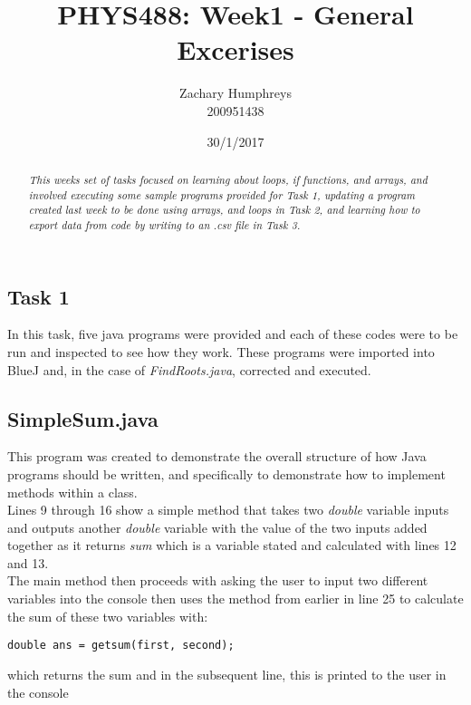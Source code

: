 \documentclass{article}
\title{PHYS488: Week1 - General Excerises}
\author{Zachary Humphreys \\ 200951438}
\date{30/1/2017}
\begin{document}
	\maketitle
	\begin{abstract}
		\begin{center}
		\textit{This weeks set of tasks focused on learning about loops, if functions, and arrays, and involved executing some sample programs provided for Task 1, updating a program created last week to be done using arrays, and loops in Task 2, and learning how to export data from code by writing to an .csv file in Task 3.}
		\end{center}
	\end{abstract}
\begin{multicols}{2}
	\section{Task 1}
		In this task, five java programs were provided and each of these codes were to be run and inspected to see how they work. These programs were imported into BlueJ and, in the case of \textit{FindRoots.java}, corrected and executed.
		\subsection{SimpleSum.java}
			 This program was created to demonstrate the overall structure of how Java programs should be written, and specifically to demonstrate how to implement methods within a class. \\ \indent Lines 9 through 16 show a simple method that takes two \textit{double} variable inputs and outputs another \textit{double} variable with the value of the two inputs added together as it returns \textit{sum} which is a variable stated and calculated with lines 12 and 13. \\ \indent The main method then proceeds with asking the user to input two different variables into the console then uses the method from earlier in line 25 to calculate the sum of these two variables with:
			 \begin{lstlisting}
double ans = getsum(first, second);
			 \end{lstlisting} 
			 which returns the sum and in the subsequent line, this is printed to the user in the console

\end{multicols}
\end{document}
